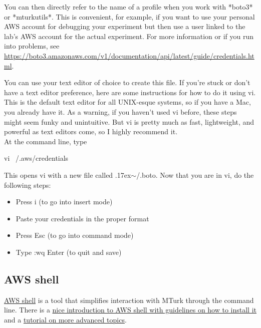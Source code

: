 \documentclass{article}
\newenvironment{code}%
   {\par\noindent\adjustbox{margin=1ex,bgcolor=shadecolor,margin=0ex \medskipamount}\bgroup\minipage\linewidth\verbatim}%
   {\endverbatim\endminipage\egroup}
\begin{document}
You can then directly refer to the name of a profile when you work with *boto3* or *mturkutils*. This is convenient, for example, if you want to use your personal AWS account for debugging your experiment but then use a user linked to the lab's AWS account for the actual experiment. For more information or if you run into problems, see \url{https://boto3.amazonaws.com/v1/documentation/api/latest/guide/credentials.html}.

\begin{tcolorbox}[colback=gray!5,colframe=blue!40!black,title=If you're stuck on how to create the config file...]

    You can use your text editor of choice to create this file. If you're stuck or don't have a text editor preference, here are some instructions for how to do it using vi. This is the default text editor for all UNIX-esque systems, so if you have a Mac, you already have it. As a warning, if you haven't used vi before, these steps might seem funky and unintuitive. But vi is pretty much as fast, lightweight, and powerful as text editors come, so I highly recommend it.  \\
    
    At the command line, type 
    
    \begin{code}
    vi ~/.aws/credentials
    \end{code}
    
    This opens vi with a new file called {\raise.17ex\hbox{$\scriptstyle\mathtt{\sim}$}}/.boto. Now that you are in vi, do the following steps:
    
    \begin{itemize}
        \item Press i (to go into insert mode)
        \item Paste your credentials in the proper format
        \item Press Esc (to go into command mode)
        \item Type :wq Enter (to quit and save)
    \end{itemize}

\end{tcolorbox} 


\subsection{AWS shell}

\href{https://github.com/awslabs/aws-shell}{AWS shell} is a tool that simplifies interaction with MTurk through the command line. There is a \href{https://blog.mturk.com/tutorial-crowdsourcing-from-the-command-line-a5bee86fdaa0}{nice introduction to AWS shell with guidelines on how to install it} and a \href{https://blog.mturk.com/tutorial-managing-mturk-hits-with-the-aws-command-line-interface-56eaabb7fd4c}{tutorial on more advanced topics}.
\end{document}
